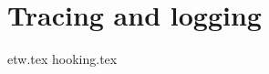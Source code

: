\documentclass{report}
\begin{document}
\chapter{Tracing and logging}
\label{cha:tracing-and-logging}
{etw.tex}
{hooking.tex}
\end{document}
